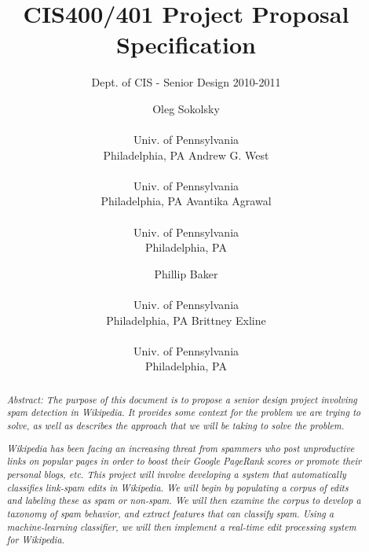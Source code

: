 \documentclass[letterpaper]{sig-alternate}
\begin{document}
 

\title{CIS400/401 Project Proposal Specification}
\subtitle{Dept. of CIS - Senior Design 2010-2011}
\author{
\alignauthor Oleg Sokolsky \\  \\ Univ. of Pennsylvania \\ Philadelphia, PA
\alignauthor Andrew G. West \\  \\ Univ. of Pennsylvania \\ Philadelphia, PA
\alignauthor Avantika Agrawal \\  \\ Univ. of Pennsylvania \\ Philadelphia, PA
\and
\alignauthor Phillip Baker \\  \\ Univ. of Pennsylvania \\ Philadelphia, PA
\alignauthor Brittney Exline \\  \\ Univ. of Pennsylvania \\ Philadelphia, PA}
\date{}
\maketitle

\begin{abstract}
\textit{Abstract: The purpose of this document is to propose a senior design project involving spam detection in Wikipedia. It provides some context for the problem we are trying to solve, as well as describes the approach that we will be taking to solve the problem.}

\textit{Wikipedia has been facing an increasing threat from spammers who post unproductive links on popular pages in order to boost their Google PageRank scores or promote their personal blogs, etc. This project will involve developing a system that automatically classifies link-spam edits in Wikipedia. We will begin by populating a corpus of edits and labeling these as spam or non-spam. We will then examine the corpus to develop a taxonomy of spam behavior, and extract features that can classify spam. Using a machine-learning classifier, we will then implement a real-time edit processing system for Wikipedia.}
\end{abstract}
\end{document}
